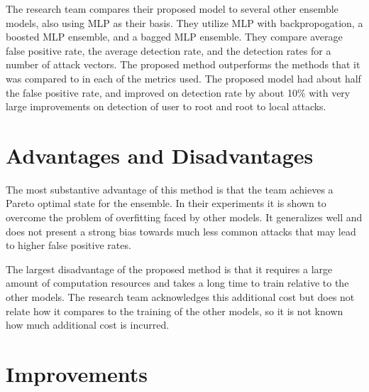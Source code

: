 \documentclass[]{article}
\begin{document}
The research team compares their proposed model to several other ensemble models, also using MLP as their basis.
They utilize MLP with backpropogation, a boosted MLP ensemble, and a bagged MLP ensemble.
They compare average false positive rate, the average detection rate, and the detection rates for a number of attack vectors. 
The proposed method outperforms the methods that it was compared to in each of the metrics used.
The proposed model had about half the false positive rate, and improved on detection rate by about 10\% with very large improvements on detection of user to root and root to local attacks.

\section{Advantages and Disadvantages}

The most substantive advantage of this method is that the team achieves a Pareto optimal state for the ensemble.
In their experiments it is shown to overcome the problem of overfitting faced by other models.
It generalizes well and does not present a strong bias towards much less common attacks that may lead to higher false positive rates.

The largest disadvantage of the proposed method is that it requires a large amount of computation resources and takes a long time to train relative to the other models.
The research team acknowledges this additional cost but does not relate how it compares to the training of the other models, so it is not known how much additional cost is incurred.

\section{Improvements}




\clearpage


\end{document}
